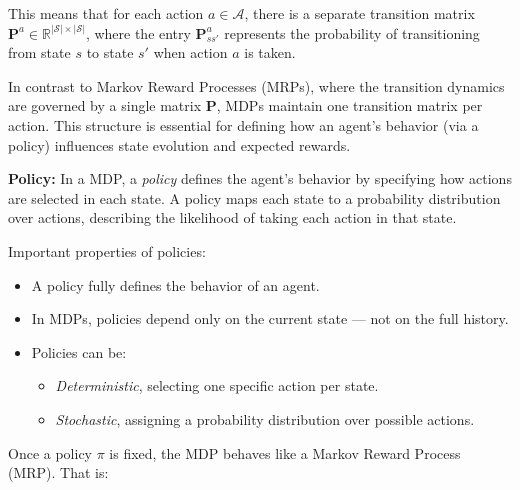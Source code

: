 \documentclass[12pt]{extreport}
\theoremstyle{definition}
\begin{document}
\medskip

This means that for each action \( a \in \mathcal{A} \), there is a separate transition matrix \( \mathbf{P}^a \in \mathbb{R}^{|\mathcal{S}| \times |\mathcal{S}|} \), where the entry \( \mathbf{P}^a_{ss'} \) represents the probability of transitioning from state \( s \) to state \( s' \) when action \( a \) is taken.

\medskip

In contrast to Markov Reward Processes (MRPs), where the transition dynamics are governed by a single matrix \( \mathbf{P} \), MDPs maintain one transition matrix per action. This structure is essential for defining how an agent's behavior (via a policy) influences state evolution and expected rewards.

\bigskip

\noindent\textbf{Policy:} In a MDP, a \textit{policy} defines the agent's behavior by specifying how actions are selected in each state. A policy maps each state to a probability distribution over actions, describing the likelihood of taking each action in that state.

\begin{center}
\end{center}

\noindent Important properties of policies:
\begin{itemize}
  \item A policy fully defines the behavior of an agent.
  \item In MDPs, policies depend only on the current state — not on the full history.
  \item Policies can be:
    \begin{itemize}
      \item \textit{Deterministic}, selecting one specific action per state.
      \item \textit{Stochastic}, assigning a probability distribution over possible actions.
    \end{itemize}
\end{itemize}

\bigskip

\noindent Once a policy \( \pi \) is fixed, the MDP behaves like a Markov Reward Process (MRP). That is:
\end{document}
